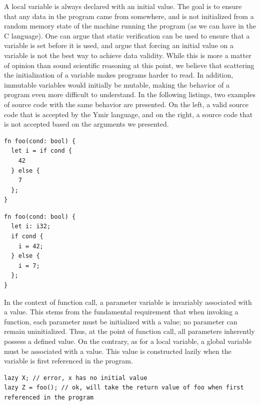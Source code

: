 A local variable is always declared with an initial value. The goal is to ensure
that any data in the program came from somewhere, and is not initialized from a
random memory state of the machine running the program (as we can have in the C
language). One can argue that static verification can be used to ensure that a
variable is set before it is used, and argue that forcing an initial value on a
variable is not the best way to achieve data validity. While this is more a
matter of opinion than sound scientific reasoning at this point, we believe that
scattering the initialization of a variable makes programs harder to read. In
addition, immutable variables would initially be mutable, making the behavior of
a program even more difficult to understand. In the following listings, two
examples of source code with the same behavior are presented. On the left, a
valid source code that is accepted by the Ymir language, and on the right, a
source code that is not accepted based on the arguments we presented.

\hspace{-15pt}%
\begin{minipage}[t][][t]{0.47\linewidth}
  \begin{lstlisting}[style=coloredverbatim, escapechar=@, caption=Valid]
fn foo(cond: bool) {
  let i = if cond {
    42
  } else {
    7
  };
}
  \end{lstlisting}
\end{minipage}\hspace{10pt}%
\begin{minipage}[t][][t]{0.47\linewidth}
  \begin{lstlisting}[style=coloredverbatimError, escapechar=@, caption=Invalid]
fn foo(cond: bool) {
  let i: i32;
  if cond {
    i = 42;
  } else {
    i = 7;
  };
}
  \end{lstlisting}
\end{minipage}

In the context of function call, a parameter variable is invariably associated
with a value. This stems from the fundamental requirement that when invoking a
function, each parameter must be initialized with a value; no parameter can
remain uninitialized. Thus, at the point of function call, all parameters
inherently possess a defined value. On the contrary, as for a local variable, a
global variable must be associated with a value. This value is constructed
lazily when the variable is first referenced in the program.

\begin{lstlisting}[style=coloredverbatimError]
lazy X; // error, x has no initial value
lazy Z = foo(); // ok, will take the return value of foo when first referenced in the program
\end{lstlisting}

